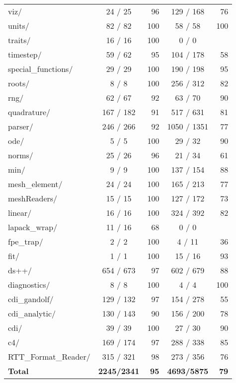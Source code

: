 \begin{table}
\begin{center}
\begin{tabular}{lcrcr}
viz/                 &   24 /    25 &  96 &    129 /   168 &  76  \\
units/               &   82 /    82 & 100 &     58 /    58 & 100 \\
traits/              &   16 /    16 & 100 &      0 /     0        \\
timestep/            &   59 /    62 &  95 &    104 /   178 &  58 \\
special\_functions/  &   29 /    29 & 100 &    190 /   198 &  95 \\
roots/               &    8 /     8 & 100 &    256 /   312 &  82 \\
rng/                 &   62 /    67 &  92 &     63 /    70 &  90 \\
quadrature/          &  167 /   182 &  91 &    517 /   631 &  81 \\
parser/              &  246 /   266 &  92 &   1050 /  1351 &  77 \\
ode/                 &    5 /     5 & 100 &     29 /    32 &  90 \\
norms/               &   25 /    26 &  96 &     21 /    34 &  61 \\
min/                 &    9 /     9 & 100 &    137 /   154 &  88 \\
mesh\_element/       &    24 /    24 & 100&     165 /   213 &  77 \\
meshReaders/         &   15 /     15 & 100 &    127 /   172 &  73 \\
linear/              &   16 /     16 & 100 &    324 /   392 &  82 \\
lapack\_wrap/        &    11 /    16 &  68&       0 /     0        \\
fpe\_trap/           &     2 /     2 & 100&       4 /    11 &  36 \\
fit/                 &    1 /      1 & 100 &     15 /    16 &  93 \\
ds++/                &  654 /    673 &  97 &    602 /   679 &  88 \\
diagnostics/         &    8 /      8 & 100 &      4 /     4 & 100 \\
cdi\_gandolf/        &   129 /   132 &  97&     154 /   278 &  55 \\
cdi\_analytic/       &   130 /   143 &  90&     156 /   200 &  78 \\
cdi/                 &   39 /     39 & 100 &     27 /    30 &  90 \\
c4/                  &  169 /    174 &  97 &    288 /   338 &  85 \\
RTT\_Format\_Reader/ &    315 /  321 & 98 &     273 /   356 &  76 \\

     \hline
      {\bf Total} & {\bf 2245/2341} & {\bf 95} & {\bf 4693/5875} & {\bf 79} \\

      \hline\hline
    \end{tabular}
  \end{center}
\end{table}

